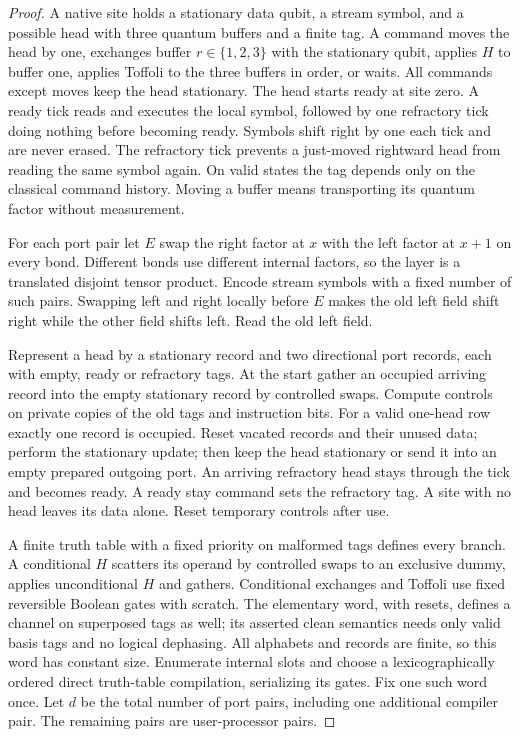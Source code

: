 \begin{proof}
A native site holds a stationary data qubit, a stream symbol, and a possible head with three quantum buffers and a finite tag. A command moves the head by one, exchanges buffer $r\in\{1,2,3\}$ with the stationary qubit, applies $H$ to buffer one, applies Toffoli to the three buffers in order, or waits. All commands except moves keep the head stationary. The head starts ready at site zero. A ready tick reads and executes the local symbol, followed by one refractory tick doing nothing before becoming ready. Symbols shift right by one each tick and are never erased. The refractory tick prevents a just-moved rightward head from reading the same symbol again. On valid states the tag depends only on the classical command history. Moving a buffer means transporting its quantum factor without measurement.

For each port pair let $E$ swap the right factor at $x$ with the left factor at $x+1$ on every bond. Different bonds use different internal factors, so the layer is a translated disjoint tensor product. Encode stream symbols with a fixed number of such pairs. Swapping left and right locally before $E$ makes the old left field shift right while the other field shifts left. Read the old left field.

Represent a head by a stationary record and two directional port records, each with empty, ready or refractory tags. At the start gather an occupied arriving record into the empty stationary record by controlled swaps. Compute controls on private copies of the old tags and instruction bits. For a valid one-head row exactly one record is occupied. Reset vacated records and their unused data; perform the stationary update; then keep the head stationary or send it into an empty prepared outgoing port. An arriving refractory head stays through the tick and becomes ready. A ready stay command sets the refractory tag. A site with no head leaves its data alone. Reset temporary controls after use.

A finite truth table with a fixed priority on malformed tags defines every branch. A conditional $H$ scatters its operand by controlled swaps to an exclusive dummy, applies unconditional $H$ and gathers. Conditional exchanges and Toffoli use fixed reversible Boolean gates with scratch. The elementary word, with resets, defines a channel on superposed tags as well; its asserted clean semantics needs only valid basis tags and no logical dephasing. All alphabets and records are finite, so this word has constant size. Enumerate internal slots and choose a lexicographically ordered direct truth-table compilation, serializing its gates. Fix one such word once. Let $d$ be the total number of port pairs, including one additional compiler pair. The remaining pairs are user-processor pairs.


\end{proof}
